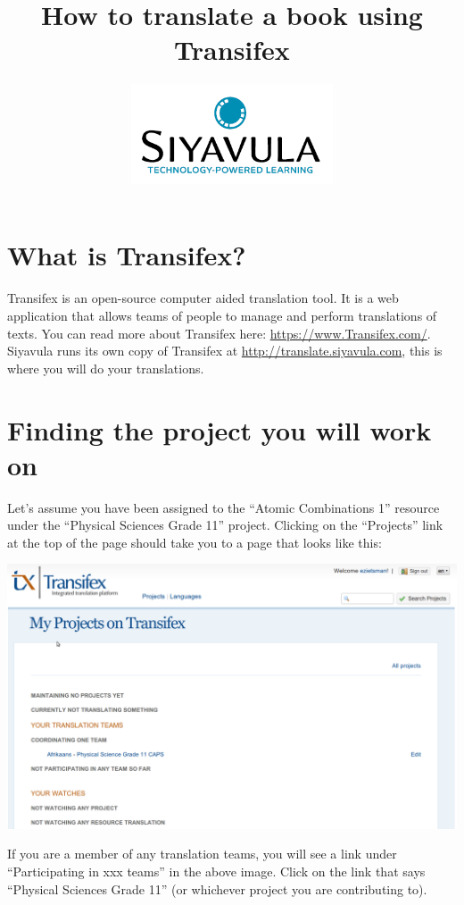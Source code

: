 \documentclass[12pt, a4paper]{article}
\title{How to translate a book using Transifex}
\author{\includegraphics[width=6cm]{images/Siyavulalogo.png}}
\date{}
\begin{document}
\maketitle
\tableofcontents
\section{What is Transifex?}

Transifex is an open-source computer aided translation tool. It is a web application that allows teams of people to manage and perform translations of texts. You can read more about Transifex here: \url{https://www.Transifex.com/}. Siyavula  runs its own copy of Transifex at  \url{http://translate.siyavula.com}, this is where you will do your translations.




\section{Finding the project you will work on}

Let's assume you have been assigned to the ``Atomic Combinations 1'' resource under the ``Physical Sciences Grade 11'' project. Clicking on the ``Projects'' link at the top of the page should take you to a page that looks like this:
\begin{center}
    \centerline{\includegraphics[width=0.8\paperwidth]{images/selectproject.png}}
\end{center}
If you are a member of any translation teams, you will see a link under ``Participating in xxx teams'' in the above image. Click on the link that says ``Physical Sciences Grade 11'' (or whichever project you are contributing to).
\end{document}

